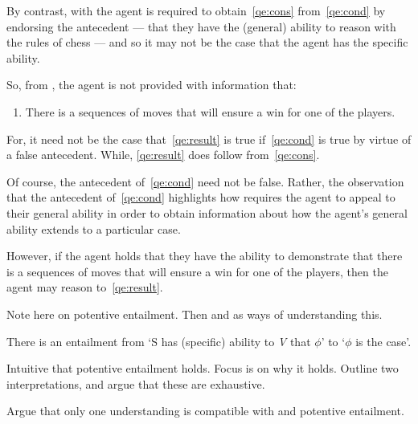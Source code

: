 \begin{note}
  By contrast, with \GSI{} the agent is required to obtain~\ref{qe:cons} from~\ref{qe:cond} by endorsing the antecedent --- that they have the (general) ability to reason with the rules of chess --- and so it may not be the case that the agent has the specific ability.

  So, from \GSI{}, the agent is not provided with information that:
  \begin{enumerate}[label=(I\arabic*), ref=(I\arabic*), resume]
  \item\label{qe:result} There is a sequences of moves that will ensure a win for one of the players.
  \end{enumerate}
  For, it need not be the case that~\ref{qe:result} is true if~\ref{qe:cond} is true by virtue of a false antecedent.
  While, \ref{qe:result} does follow from~\ref{qe:cons}.

  Of course, the antecedent of~\ref{qe:cond} need not be false.
  Rather, the observation that the antecedent of~\ref{qe:cond} highlights how \GSI{} requires the agent to appeal to their general ability in order to obtain information about how the agent's general ability extends to a particular case.

  However, if the agent holds that they have the ability to demonstrate that there is a sequences of moves that will ensure a win for one of the players, then the agent may reason to~\ref{qe:result}.
\end{note}

\begin{note}
  Note here on potentive entailment.
  Then \AR{} and \WR{} as ways of understanding this.

  \begin{proposition}
    There is an entailment from `S has (specific) ability to \emph{V} that \(\phi\)' to `\(\phi\) is the case'.
  \end{proposition}
  Intuitive that potentive entailment holds.
  Focus is on why it holds.
  Outline two interpretations, and argue that these are exhaustive.

  Argue that only one understanding is compatible with \GSI{} and potentive entailment.
\end{note}


